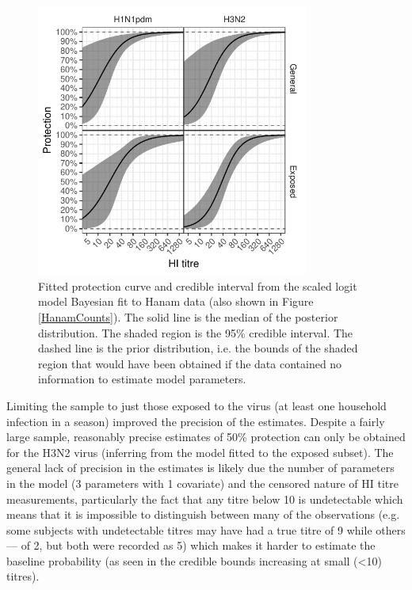 \documentclass[12pt]{article}
\begin{document}
\begin{figure}[htp]
	\centering
	\includegraphics[width=0.8\textwidth]{../fit-sclr-bayesian-plot/hanam-hi-prot.pdf}
	\caption{
	Fitted protection curve and credible interval from the scaled logit model Bayesian fit to Hanam data (also shown in Figure \ref{HanamCounts}). The solid line is the median of the posterior distribution. The shaded region is the 95\% credible interval. The dashed line is the prior distribution, i.e. the bounds of the shaded region that would have been obtained if the data contained no information to estimate model parameters.
	}
	\label{SclrBayesProt}
\end{figure}

Limiting the sample to just those exposed to the virus (at least one household infection in a season) improved the precision of the estimates. Despite a fairly large sample, reasonably precise estimates of 50\% protection can only be obtained for the H3N2 virus (inferring from the model fitted to the exposed subset). The general lack of precision in the estimates is likely due the number of parameters in the model (3 parameters with 1 covariate) and the censored nature of HI titre measurements, particularly the fact that any titre below 10 is undetectable which means that it is impossible to distinguish between many of the observations (e.g. some subjects with undetectable titres may have had a true titre of 9 while others --- of 2, but both were recorded as 5) which makes it harder to estimate the baseline probability (as seen in the credible bounds increasing at small (<10) titres).
\end{document}

